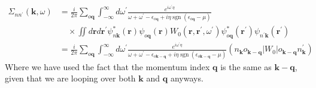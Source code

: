 \documentclass[12pt]{article}
\begin{document}
    \begin{align}
        \Sigma_{n n^\prime}(\mathbf{k}, \omega) &= \frac{i}{2 \pi} \sum_{o \mathbf{q}} \int_{-\infty}^{\infty} d \omega^{\prime} \frac{e^{i\omega ^{\prime}\eta }}{\omega + \omega^{\prime} - \epsilon_{o \mathbf{q}} + i \eta \operatorname{sgn}\left(\epsilon_{o \mathbf{q}}-\mu\right)} \nonumber \\
        &\quad \times \iint d \mathbf{r} d \mathbf{r}^\prime \psi_{n\mathbf{k}}^{*}(\mathbf{r}) \psi_{o \mathbf{q}}(\mathbf{r}) W_0(\mathbf{r}, \mathbf{r}^\prime, \omega^{\prime}) \psi_{o \mathbf{q}}^{*}\left(\mathbf{r}^{\prime}\right) \psi_{n^\prime\mathbf{k}}(\mathbf{r}^\prime)\\
        &= \frac{i}{2 \pi} \sum_{o \mathbf{q}} \int_{-\infty}^{\infty} d \omega^{\prime} \frac{e^{i\omega ^{\prime}\eta }}{\omega + \omega^{\prime} - \epsilon_{o \mathbf{k}-\mathbf{q}} + i \eta \operatorname{sgn}\left(\epsilon_{o \mathbf{k}-\mathbf{q}}-\mu\right)} (n_{\mathbf{k}}o_{\mathbf{k-q}}|W_0|o_{\mathbf{k-q}}n^\prime_{\mathbf{k}})
    \end{align}
    Where we have used the fact that the momentum index $\mathbf{q}$ is the same as $\mathbf{k}-\mathbf{q}$, given that we are looping over both $\mathbf{k}$ and $\mathbf{q}$ anyways.
\end{document}
